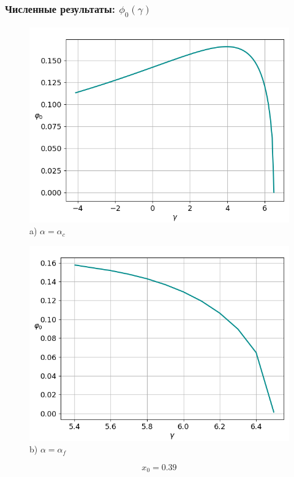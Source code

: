 \documentclass[fullscreen=true, unicode, bookmarks=false]{beamer}
\begin{document}
\begin{frame}
\frametitle{ Численные результаты: $ \phi_0(\gamma) $ }

\begin{figure} 
\begin{minipage}[h]{0.49\linewidth}
\begin{center}
\includegraphics[scale=0.32]{oscillating_phi0_x0_039.png} \\ {\scriptsize a) $ \alpha = \alpha_c $}
\end{center}
\end{minipage} 
\hfill
\begin{minipage}[h]{0.49\linewidth}
\begin{center}
\includegraphics[scale=0.32]{oscillating_phi0_after_tangent_x0_039.png}  \\ {\scriptsize b) $ \alpha = \alpha_f $}
\end{center}
\end{minipage} 
\end{figure}

$$ x_0 = 0.39 $$

\end{frame}
\end{document}
